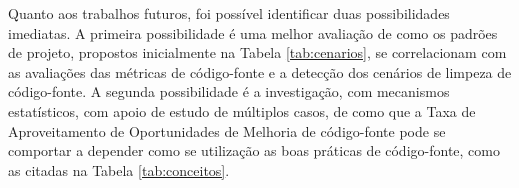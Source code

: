 Quanto aos trabalhos futuros, foi possível identificar duas possibilidades imediatas. A primeira possibilidade é uma melhor avaliação de como os padrões de projeto, propostos inicialmente na Tabela \ref{tab:cenarios}, se correlacionam com as avaliações das métricas de código-fonte e a detecção dos cenários de limpeza de código-fonte. A segunda possibilidade é a investigação, com mecanismos estatísticos, com apoio de estudo de múltiplos casos, de como que a Taxa de Aproveitamento de Oportunidades de Melhoria de código-fonte pode se comportar a depender como se utilização as boas práticas de código-fonte, como as citadas na Tabela \ref{tab:conceitos}.
